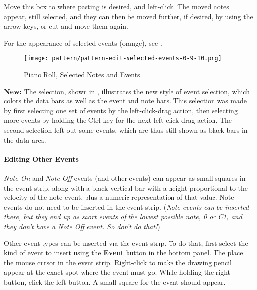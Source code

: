    Move this box to where pasting is
   desired, and left-click.  The moved notes appear, still selected,
   and they can then be moved further, if desired, by using the arrow keys, or
   cut and move them again.

   For the appearance of selected events (orange), see
   .

\begin{figure}[H]
   \centering 
   \texttt{[image: pattern/pattern-edit-selected-events-0-9-10.png]}
   \caption{Piano Roll, Selected Notes and Events}
   \label{fig:pattern_editor_selected_events}
\end{figure}

   \textbf{New:}
   The selection, shown in
   ,
   illustrates the new style of event selection, which colors the data
   bars as well as the event and note bars.  This selection was made by first
   selecting one set of events by the
   left-click-drag action, then
   selecting more events by holding the Ctrl key for the next left-click drag
   action.  The second selection left out some events, which are thus still
   shown as black bars in the data area.
   
\paragraph{Editing Other Events}
\label{paragraph:seq64_pattern_editor_other_events}


   \textsl{Note On} and \textsl{Note Off} events (and other events) can appear
   as small squares in the event strip, along with a black vertical bar with a
   height proportional to the velocity of the note event, plus a numeric
   representation of that value.
   Note events do not need to be inserted in the event strip.
   (\textsl{Note events can be inserted there, but they end up as short
   events of the lowest possible note, 0 or C1, and they don't have a Note
   Off event.  So don't do that!})

   Other event types can be inserted via the event strip.  To do that, first
   select the kind of event to insert using the \textbf{Event} button in the
   bottom panel.  The place the mouse cursor in the event strip.
   Right-click to make the drawing pencil appear at the exact spot where the
   event must go.  While holding the right button, click the left button.
   A small square for the event should appear.

